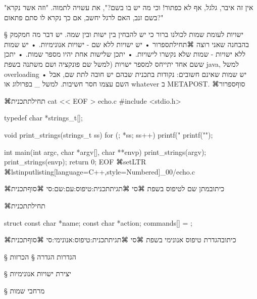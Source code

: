 "אין זה איבר, גלגל, אף לא כפתור! וכי מה יש בו בשם?", את עשויה לתמוה. 
"וזה אשר נקרא בשם זנב, האם לרגל יחשב, אם כך נקרא לו סתם פתאום?"


§ ישויות לעומת שמות
לכולנו ברור כי יש להבחין בין ישות ובין שמה.
יש דבר מה חמקמק בהבחנה שאני רוצה 
⌘תחילת{ספרור}
• יש ישויות ללא שם - ישויות אנונימיות.
• יש שמות ללא ישויות - שמות שלא נקשרו לישויות.
• יתכן שלישות אחת יהיו מספר שמות.
• יתכן ששם אחד יתייחס למספר ישויות (למשל שם פונקציה ושם משתנה בשפת java, למשל overloading
• יש שמות שאינם חשובים:  נקודות בתכנית שבהם יש חובה לתת שם, אבל השם עצמו חסר חשיבות. למשל 
_ בפרולוג או whatever ב METAPOST.
⌘סוף{ספרור}

⌘תחילת{תכנית}
\bash
cat << EOF > echo.c
#include <stdio.h>

typedef char *strings_t[];

void print_strings(strings_t ss) {
  for (; *ss; ss++)
    printf("%
  printf("\n");
}

int main(int argc, char *argv[], char **envp) {
  print_strings(argv);
  print_strings(envp);
  return 0;
}
EOF
\END
⌘setLTR
⌘lstinputlisting[language=C++,style=Numbered]{_00/echo.c}

⌘כיתוב{מתן שם לטיפוס בשפת ⌘סי}
⌘תגית{תכנית:טיפוס:עם:שם:סי}
⌘סוף{תכנית}




⌘תחילת{תכנית}
\begin{CPPn}
struct {
  const char *name;
  const char *action;
} commands[] = {
};
\end{CPPn}
⌘כיתוב{הגדרת טיפוס אנונימי בשפת ⌘סי}
⌘תגית{תכנית:טיפוס:אנונימי:סי}
⌘סוף{תכנית}

§ הגדרות
הגדרה
§ הכרזות

§ יצירת ישויות אנונימיות

§ מרחבי שמות















